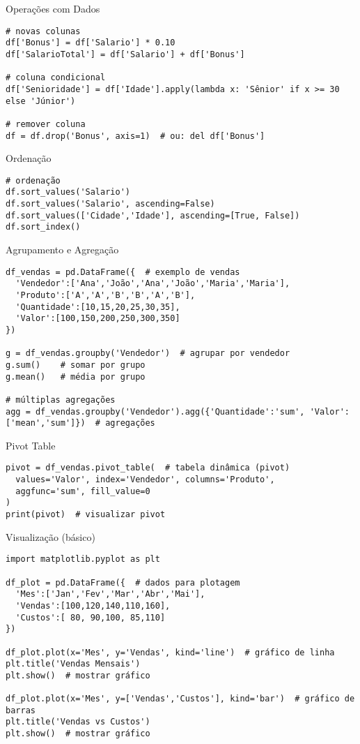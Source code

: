 \documentclass[aspectratio=169]{beamer}
\begin{document}
\begin{frame}[fragile]{Operações com Dados}
\begin{lstlisting}
# novas colunas
df['Bonus'] = df['Salario'] * 0.10
df['SalarioTotal'] = df['Salario'] + df['Bonus']

# coluna condicional
df['Senioridade'] = df['Idade'].apply(lambda x: 'Sênior' if x >= 30 else 'Júnior')

# remover coluna
df = df.drop('Bonus', axis=1)  # ou: del df['Bonus']
\end{lstlisting}
\end{frame}

\begin{frame}[fragile]{Ordenação}
\begin{lstlisting}
# ordenação
df.sort_values('Salario')
df.sort_values('Salario', ascending=False)
df.sort_values(['Cidade','Idade'], ascending=[True, False])
df.sort_index()
\end{lstlisting}
\end{frame}

\begin{frame}[fragile]{Agrupamento e Agregação}
\begin{lstlisting}
df_vendas = pd.DataFrame({  # exemplo de vendas
  'Vendedor':['Ana','João','Ana','João','Maria','Maria'],
  'Produto':['A','A','B','B','A','B'],
  'Quantidade':[10,15,20,25,30,35],
  'Valor':[100,150,200,250,300,350]
})

g = df_vendas.groupby('Vendedor')  # agrupar por vendedor
g.sum()    # somar por grupo
g.mean()   # média por grupo

# múltiplas agregações
agg = df_vendas.groupby('Vendedor').agg({'Quantidade':'sum', 'Valor':['mean','sum']})  # agregações
\end{lstlisting}
\end{frame}

\begin{frame}[fragile]{Pivot Table}
\begin{lstlisting}
pivot = df_vendas.pivot_table(  # tabela dinâmica (pivot)
  values='Valor', index='Vendedor', columns='Produto',
  aggfunc='sum', fill_value=0
)
print(pivot)  # visualizar pivot
\end{lstlisting}
\end{frame}

\begin{frame}[fragile]{Visualização (básico)}
\begin{lstlisting}
import matplotlib.pyplot as plt

df_plot = pd.DataFrame({  # dados para plotagem
  'Mes':['Jan','Fev','Mar','Abr','Mai'],
  'Vendas':[100,120,140,110,160],
  'Custos':[ 80, 90,100, 85,110]
})

df_plot.plot(x='Mes', y='Vendas', kind='line')  # gráfico de linha
plt.title('Vendas Mensais')
plt.show()  # mostrar gráfico

df_plot.plot(x='Mes', y=['Vendas','Custos'], kind='bar')  # gráfico de barras
plt.title('Vendas vs Custos')
plt.show()  # mostrar gráfico
\end{lstlisting}
\end{frame}
\end{document}
